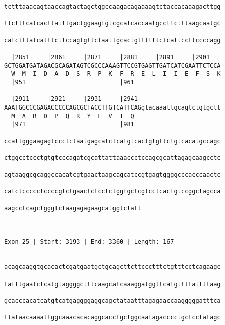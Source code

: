 \documentclass{article}
\begin{document}
\begin{Verbatim}
tctttaaacagtaaccagtactagctggccaagacagaaaagtctaccacaaagacttgg
                                                            
ttctttcatcacttatttgactggaagtgtcgcatcaccaatgccttctttaagcaatgc
                                                            
catctttatcatttcttccagtgttctaattgcactgttttttctcattccttccccagg
                                                            
  |2851     |2861     |2871     |2881     |2891     |2901   
GCTGGATGATAGACGCAGATAGTCGCCCAAAGTTCCGTGAGTTGATCATCGAATTCTCCA
  W  M  I  D  A  D  S  R  P  K  F  R  E  L  I  I  E  F  S  K
  |951                          |961                        
  
  |2911     |2921     |2931     |2941                       
AAATGGCCCGAGACCCCCAGCGCTACCTTGTCATTCAGgtacaaattgcagtctgtgctt
  M  A  R  D  P  Q  R  Y  L  V  I  Q                        
  |971                          |981                        
  
ccattgggaagagtccctctaatgagcatctcatgtcactgtgttctgtcacatgccagc
                                                            
ctggcctccctgtgtcccagatcgcattattaaaccctccagcgcattagagcaagcctc
                                                            
agtaaggcgcaggccacatcgtgaactaagcagcatccgtgagtggggcccacccaactc
                                                            
catctccccctccccgtctgaactctcctctggtgctcgtcctcactgtccggctagcca
                                                            
aagcctcagctgggtctaagagagaagcatggtctatt
                                      
                                      
 
Exon 25 | Start: 3193 | End: 3360 | Length: 167


acagcaaggtgcacactcgatgaatgctgcagcttcttccctttctgtttcctcagaagc
                                                            
tatttgaatctcatgtaggggctttcaagcatcaaaggatggttcatgttttattttaag
                                                            
gcacccacatcatgtcatgaggggaggcagctataatttagagaaccaagggggatttca
                                                            
ttataacaaaattggcaaacacacaggcacctgctggcaatagacccctgctcctatagc
                                                            

\end{Verbatim}
\end{document}
